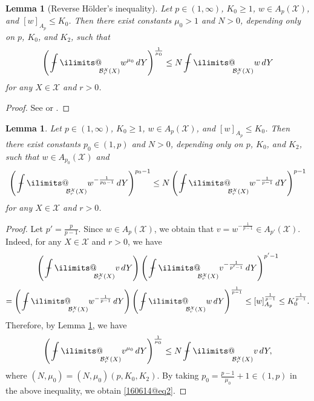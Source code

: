 \documentclass[reqno]{amsart}
\numberwithin{equation}{section}
\theoremstyle{plain}
\newtheorem{lemma}[theorem]{Lemma}
\theoremstyle{definition}
\theoremstyle{remark}
\begin{document}
\begin{lemma}[Reverse H\"older's inequality]		\label{1016@lem1}
Let $p\in (1,\infty)$, $K_0 \ge 1$, $w\in A_p({\mathcal{X}})$, and  $[w]_{A_p}\le K_0$.
Then there exist constants $\mu_0>1$ and $N>0$, depending only on $p$, $K_0$, and $K_2$, such that 
$$
\left({\operatorname{\,\,\text{\bf--}\kern-.98em\DOTSI\intop\ilimits@\!\!}}_{{\mathcal{B}}_r^{\mathcal{X}}(X)} w^{\mu_0}\,dY\right)^{\frac{1}{\mu_0}}\le N{\operatorname{\,\,\text{\bf--}\kern-.98em\DOTSI\intop\ilimits@\!\!}}_{{\mathcal{B}}_r^{\mathcal{X}}(X)}w\,dY
$$
for any $X\in {\mathcal{X}}$ and $r>0$.
\end{lemma}

\begin{proof}
See \cite[Theorem 7.3.3]{MR3243734} or \cite[Theorem 3, p. 212]{MR1232192}.
\end{proof}

\begin{lemma}		\label{1016@lem2}
Let $p\in (1,\infty)$, $K_0 \ge 1$, $w\in A_p({\mathcal{X}})$, and  $[w]_{A_p}\le K_0$.
Then there exist constants $p_0\in (1,p)$ and $N>0$, depending only on $p$, $K_0$, and $K_2$, such that $w\in A_{p_0}({\mathcal{X}})$ and 
\begin{equation}		\label{160614@eq2}
\left({\operatorname{\,\,\text{\bf--}\kern-.98em\DOTSI\intop\ilimits@\!\!}}_{{\mathcal{B}}_r^{\mathcal{X}}(X)}w^{-\frac{1}{p_0-1}}\,dY\right)^{p_0-1}\le N \left({\operatorname{\,\,\text{\bf--}\kern-.98em\DOTSI\intop\ilimits@\!\!}}_{{\mathcal{B}}_r^{\mathcal{X}}(X)}w^{-\frac{1}{p-1}}\,dY\right)^{p-1}
\end{equation}
for any $X\in {\mathcal{X}}$ and $r>0$.
\end{lemma}

\begin{proof}
Let $p'=\frac{p}{p-1}$.
Since $w\in A_p({\mathcal{X}})$, we obtain that   $v=w^{-\frac{1}{p-1}}\in A_{p'}({\mathcal{X}})$.
Indeed, for any $X\in {\mathcal{X}}$ and $r>0$, we have 
$$
\left({\operatorname{\,\,\text{\bf--}\kern-.98em\DOTSI\intop\ilimits@\!\!}}_{{\mathcal{B}}^{\mathcal{X}}_r(X)}v\,dY\right)\left({\operatorname{\,\,\text{\bf--}\kern-.98em\DOTSI\intop\ilimits@\!\!}}_{{\mathcal{B}}^{\mathcal{X}}_r(X)}v^{-\frac{1}{p'-1}}\,dY\right)^{p'-1}
$$
$$
=\left({\operatorname{\,\,\text{\bf--}\kern-.98em\DOTSI\intop\ilimits@\!\!}}_{{\mathcal{B}}^{\mathcal{X}}_r(X)}w^{-\frac{1}{p-1}}\,dY\right)\left({\operatorname{\,\,\text{\bf--}\kern-.98em\DOTSI\intop\ilimits@\!\!}}_{{\mathcal{B}}^{\mathcal{X}}_r(X)}w\,dY\right)^{\frac{1}{p-1}}
\le [w]_{A_p}^{\frac{1}{p-1}}\le K_0^{\frac{1}{p-1}}.
$$
Therefore, by Lemma \ref{1016@lem1}, we have 
\[
\left({\operatorname{\,\,\text{\bf--}\kern-.98em\DOTSI\intop\ilimits@\!\!}}_{{\mathcal{B}}^{\mathcal{X}}_r(X)}v^{\mu_0}\,dY\right)^{\frac{1}{\mu_0}}\le N{\operatorname{\,\,\text{\bf--}\kern-.98em\DOTSI\intop\ilimits@\!\!}}_{{\mathcal{B}}^{\mathcal{X}}_r(X)}v\,dY,
\]
where $(N,\mu_0)=(N,\mu_0)(p, K_0, K_2)$.
By taking $p_0=\frac{p-1}{\mu_0}+1\in (1,p)$ in the above inequality, we obtain \eqref{160614@eq2}.
\end{proof}
\end{document}
